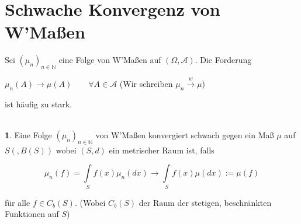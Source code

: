 \documentclass[10pt,a4paper]{report}
\newcommand{\N}{\mathbb{N}}
\numberwithin{equation}{section}
\numberwithin{figure}{section}
\theoremstyle{plain}
\theoremstyle{definition}
\newtheorem{defn}{\protect\definitionname}[section]
\theoremstyle{plain}
\theoremstyle{definition}
\theoremstyle{remark}
\theoremstyle{plain}
\theoremstyle{plain}
\theoremstyle{plain}
\theoremstyle{plain}
\theoremstyle{plain}
\providecommand{\definitionname}{Definition}
\newcommand{\1}{ \mathbb{1} } %
\begin{document}
\section{Schwache Konvergenz von W'Maßen}
Sei $(\mu_n)_{n \in \N}$ eine Folge von W'Maßen auf $(\Omega,\mathcal{A})$. Die Forderung
\begin{center}
$\mu_n(A) \to \mu(A) \qquad \forall A \in \mathcal{A}$ (Wir schreiben $\mu_n \overset{w}{\to} \mu$)
\end{center}
ist häufig zu stark.\\\\
\begin{defn}
  Eine Folge $(\mu_n)_{n \in \N}$ von W'Maßen konvergiert schwach
  gegen ein Maß $\mu$ auf $S(,B(S))$ wobei $(S,d)$ ein metrischer Raum
  ist, falls
  \begin{center}
    \[\mu_n(f)=\int\limits_S f(x)\mu_n(dx) \to
    \int\limits_Sf(x)\mu(dx):=\mu(f)\]
  \end{center}
  für alle $f \in C_b(S)$. (Wobei $C_b(S)$ der Raum der stetigen, beschränkten Funktionen auf $S$)\\\\
\end{defn}
\end{document}
